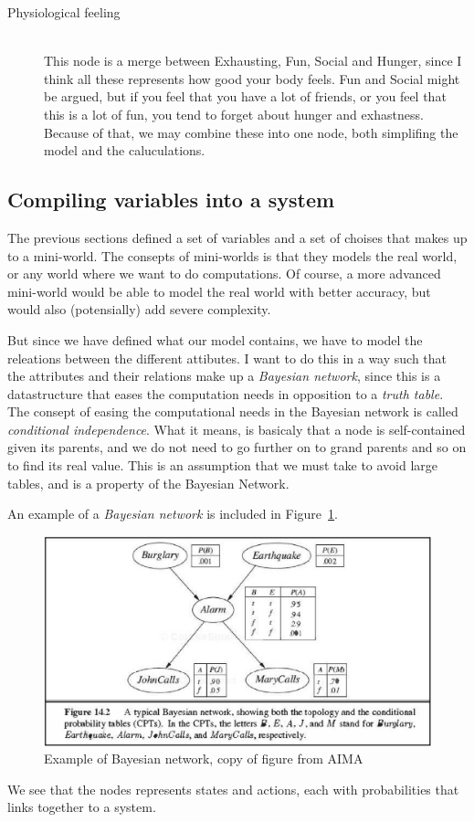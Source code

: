 \begin{description}
\item[Physiological feeling] \hfill\\
This node is a merge between Exhausting, Fun, Social and Hunger, since I think
all these represents how good your body feels. Fun and Social might be argued,
but if you feel that you have a lot of friends, or you feel that this is a lot
of fun, you tend to forget about hunger and exhastness. Because of that, we may
combine these into one node, both simplifing the model and the caluculations.

\end{description}

\subsection{Compiling variables into a system}
The previous sections defined a set of variables and a set of choises that
makes up to a mini-world. The consepts of mini-worlds is that
they models the real world, or any world where we want to do computations. Of course, a more
advanced mini-world would be able to model the real world with better accuracy,
but would also (potensially) add severe complexity.

But since we have defined what our model contains, we have to model the
releations between the different attibutes. I want to do this in a way such that
the attributes and their relations make up a \emph{Bayesian network}, since this is a datastructure that eases the
computation needs in opposition to a  \emph{truth
table}\cite{aima}. The consept of easing the computational needs in the Bayesian
network is called \emph{conditional independence}. What it means, is basicaly that a node is self-contained given
its parents, and we do not need to go further on to grand parents and so on to
find its real value. This is an assumption that we must take to avoid large
tables, and is a property of the Bayesian Network.

An example of a \emph{Bayesian network} is included in
Figure~\ref{fig:BayExample}.
\begin{figure}[h]
\includegraphics[width=122mm]{figure-example1.png}
\caption{Example of Bayesian network, copy of figure from AIMA\cite{aima}}
\label{fig:BayExample}
\end{figure}
We see that the nodes represents states and actions, each with probabilities
that links together to a system.

